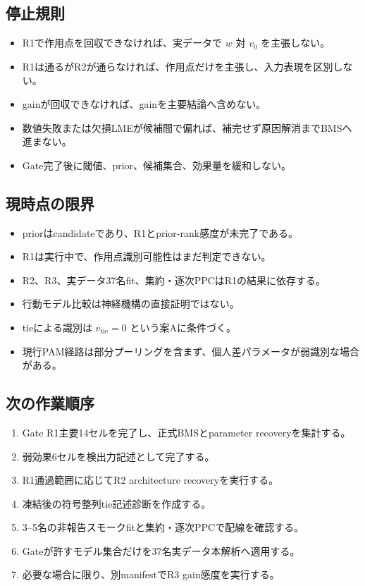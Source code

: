 \documentclass[11pt]{ltjsarticle}
\begin{document}
\subsection{停止規則}

\begin{itemize}
  \item R1で作用点を回収できなければ、実データで \(w\) 対 \(v_0\) を主張しない。
  \item R1は通るがR2が通らなければ、作用点だけを主張し、入力表現を区別しない。
  \item gainが回収できなければ、gainを主要結論へ含めない。
  \item 数値失敗または欠損LMEが候補間で偏れば、補完せず原因解消までBMSへ進まない。
  \item Gate完了後に閾値、prior、候補集合、効果量を緩和しない。
\end{itemize}

\subsection{現時点の限界}

\begin{itemize}
  \item priorはcandidateであり、R1とprior-rank感度が未完了である。
  \item R1は実行中で、作用点識別可能性はまだ判定できない。
  \item R2、R3、実データ37名fit、集約・逐次PPCはR1の結果に依存する。
  \item 行動モデル比較は神経機構の直接証明ではない。
  \item tieによる識別は \(v_{\mathrm{tie}}=0\) という案Aに条件づく。
  \item 現行PAM経路は部分プーリングを含まず、個人差パラメータが弱識別な場合がある。
\end{itemize}

\subsection{次の作業順序}

\begin{enumerate}
  \item Gate R1主要14セルを完了し、正式BMSとparameter recoveryを集計する。
  \item 弱効果6セルを検出力記述として完了する。
  \item R1通過範囲に応じてR2 architecture recoveryを実行する。
  \item 凍結後の符号整列tie記述診断を作成する。
  \item 3--5名の非報告スモークfitと集約・逐次PPCで配線を確認する。
  \item Gateが許すモデル集合だけを37名実データ本解析へ適用する。
  \item 必要な場合に限り、別manifestでR3 gain感度を実行する。
\end{enumerate}
\end{document}
